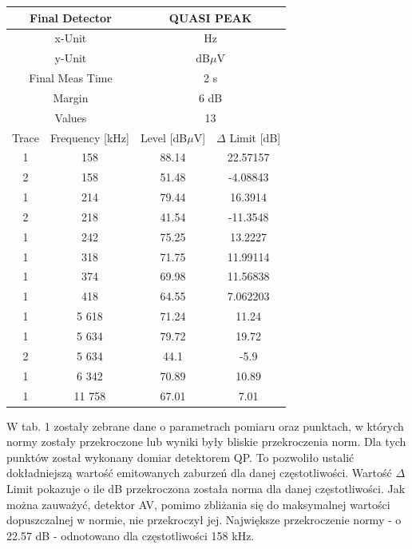 \documentclass[12pt, a4paper, oneside]{article}
\begin{document}
\begin{table}[h!]
\begin{tabular}{|c|c|c|c|}
    \multicolumn{2}{|c|}{Final Detector} & \multicolumn{2}{|c|}{QUASI PEAK} \\\hline
    \multicolumn{2}{|c|}{x-Unit} & \multicolumn{2}{|c|}{Hz} \\\hline
    \multicolumn{2}{|c|}{y-Unit} & \multicolumn{2}{|c|}{dB$\mu$V} \\\hline
    \multicolumn{2}{|c|}{Final Meas Time} & \multicolumn{2}{|c|}{2 s} \\\hline
    \multicolumn{2}{|c|}{Margin} & \multicolumn{2}{|c|}{6 dB} \\\hline
    \multicolumn{2}{|c|}{Values} & \multicolumn{2}{|c|}{13} \\\hline
    Trace & Frequency [kHz] & Level [dB$\mu$V] & $\Delta$ Limit [dB] \\\hline
    1 & 158   & 88.14 & 22.57157 \\\hline
    2 & 158   & 51.48 & -4.08843 \\\hline
    1 & 214   & 79.44 & 16.3914 \\\hline
    2 & 218   & 41.54 & -11.3548 \\\hline
    1 & 242   & 75.25 & 13.2227 \\\hline
    1 & 318   & 71.75 & 11.99114 \\\hline
    1 & 374   & 69.98 & 11.56838 \\\hline
    1 & 418   & 64.55 & 7.062203 \\\hline
    1 & 5 618   & 71.24 & 11.24 \\\hline
    1 & 5 634   & 79.72 & 19.72 \\\hline
    2 & 5 634   & 44.1 & -5.9 \\\hline
    1 & 6 342   & 70.89 & 10.89 \\\hline
    1 & 11 758   & 67.01 & 7.01 \\\hline
    \end{tabular}%
  \label{tab:addlabel}%
\end{table}%
W tab. 1 zostały zebrane dane o parametrach pomiaru oraz punktach, w których normy zostały przekroczone lub wyniki były bliskie przekroczenia norm. Dla tych punktów został wykonany domiar detektorem QP. To pozwoliło ustalić dokładniejszą wartość emitowanych zaburzeń dla danej częstotliwości. Wartość $\Delta$ Limit pokazuje o ile dB przekroczona została norma dla danej częstotliwości. Jak można zauważyć, detektor AV, pomimo zbliżania się do maksymalnej wartości dopuszczalnej w normie, nie przekroczył jej. Największe przekroczenie normy - o 22.57 dB - odnotowano dla częstotliwości 158 kHz.
\end{document}

